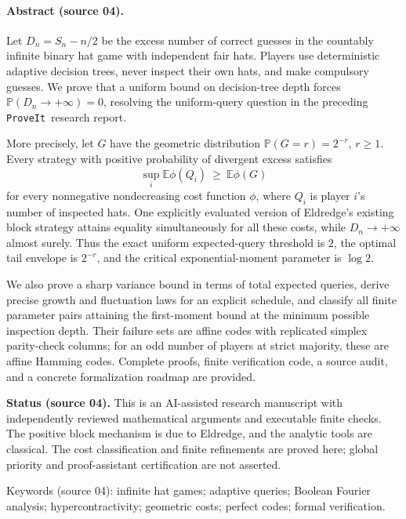\documentclass[11pt,letterpaper]{article}
\theoremstyle{definition}
\newcommand{\E}{\mathbb E}
\newcommand{\Prb}{\mathbb P}
\newcommand{\repo}{\texttt{ProveIt}}
\begin{document}
\paragraph{Abstract (source 04).}
Let \(D_n=S_n-n/2\) be the excess number of correct guesses in the
countably infinite binary hat game with independent fair hats.
Players use deterministic adaptive decision trees, never inspect their
own hats, and make compulsory guesses. We prove that a uniform bound
on decision-tree depth forces
\(\Prb(D_n\to+\infty)=0\), resolving the uniform-query question in the
preceding \repo\ research report.

More precisely, let \(G\) have the geometric distribution
\(\Prb(G=r)=2^{-r}\), \(r\ge1\). Every strategy with positive probability
of divergent excess satisfies
\[
 \sup_i\E\phi(Q_i)\ \ge\ \E\phi(G)
\]
for every nonnegative nondecreasing cost function \(\phi\), where \(Q_i\)
is player \(i\)'s number of inspected hats. One explicitly evaluated
version of Eldredge's existing block strategy attains equality
simultaneously for all these costs, while \(D_n\to+\infty\) almost surely.
Thus the exact uniform expected-query threshold is \(2\), the optimal
tail envelope is \(2^{-r}\), and the critical exponential-moment
parameter is \(\log 2\).

We also prove a sharp variance bound in terms of total expected queries,
derive precise growth and fluctuation laws for an explicit schedule,
and classify all finite parameter pairs attaining the first-moment
bound at the minimum possible inspection depth. Their failure sets
are affine codes with replicated simplex parity-check columns; for an
odd number of players at strict majority, these are affine Hamming
codes. Complete proofs,
finite verification code,
a source audit, and a concrete formalization roadmap are provided.

\begin{resultbox}
\textbf{Status (source 04).} This is an AI-assisted research manuscript with
independently reviewed mathematical arguments and executable finite
checks. The positive block mechanism is due to Eldredge, and the
analytic tools are classical. The cost classification and finite
refinements are proved here; global priority and proof-assistant
certification are not asserted.
\end{resultbox}

{\small\color{muted}Keywords (source 04): infinite hat games; adaptive queries;
Boolean Fourier analysis; hypercontractivity; geometric costs;
perfect codes; formal verification.\par}
\end{document}
